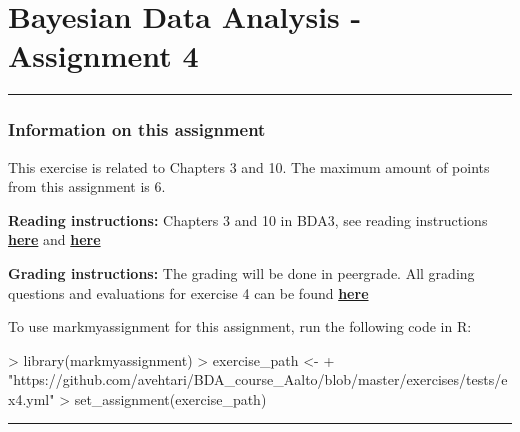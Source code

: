 \documentclass[11pt,a4paper,english]{article}
\newcommand{\HRule}{\rule{\linewidth}{0.5mm}}
\begin{document}


\section*{Bayesian Data Analysis - Assignment 4}



\HRule





\subsubsection*{Information on this assignment}

This exercise is related to Chapters 3 and 10. The maximum amount of points from this assignment is 6.


\textbf{Reading instructions:} Chapters 3 and 10 in BDA3, see reading instructions \href{https://github.com/avehtari/BDA_course_Aalto/blob/master/chapter_notes/BDA_notes_ch3.pdf}{\textbf{here}} and \href{https://github.com/avehtari/BDA_course_Aalto/blob/master/chapter_notes/BDA_notes_ch10.pdf}{\textbf{here}}

\textbf{Grading instructions:} The grading will be done in peergrade. All grading questions and evaluations for exercise 4 can be found \href{https://github.com/avehtari/BDA_course_Aalto/blob/master/exercises/ex4_rubric.md}{\textbf{here}}

To use markmyassignment for this assignment, run the following code in R:
\begin{Schunk}
\begin{Sinput}
> library(markmyassignment)
> exercise_path <- 
+   "https://github.com/avehtari/BDA_course_Aalto/blob/master/exercises/tests/ex4.yml"
> set_assignment(exercise_path)
\end{Sinput}
\end{Schunk}



\HRule

\newpage
\end{document}
